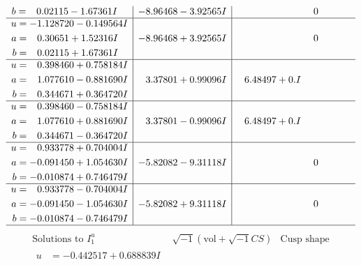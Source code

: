 \documentclass[1p]{elsarticle_modified}
\theoremstyle{definition}
\newcommand{\I}{\sqrt{-1}}
\begin{document}
$$\begin{array}{c|c|c}
\begin{aligned}
b &= \phantom{-}0.02115 - 1.67361 I\end{aligned}
 & -8.96468 - 3.92565 I & \phantom{-0.000000 } 0 \\ \hline\begin{aligned}
u &= -1.128720 - 0.149564 I \\
a &= \phantom{-}0.30651 + 1.52316 I \\
b &= \phantom{-}0.02115 + 1.67361 I\end{aligned}
 & -8.96468 + 3.92565 I & \phantom{-0.000000 } 0 \\ \hline\begin{aligned}
u &= \phantom{-}0.398460 + 0.758184 I \\
a &= \phantom{-}1.077610 - 0.881690 I \\
b &= \phantom{-}0.344671 + 0.364720 I\end{aligned}
 & \phantom{-}3.37801 + 0.99096 I & \phantom{-}6.48497 + 0. I\phantom{ +0.000000I} \\ \hline\begin{aligned}
u &= \phantom{-}0.398460 - 0.758184 I \\
a &= \phantom{-}1.077610 + 0.881690 I \\
b &= \phantom{-}0.344671 - 0.364720 I\end{aligned}
 & \phantom{-}3.37801 - 0.99096 I & \phantom{-}6.48497 + 0. I\phantom{ +0.000000I} \\ \hline\begin{aligned}
u &= \phantom{-}0.933778 + 0.704004 I \\
a &= -0.091450 + 1.054630 I \\
b &= -0.010874 + 0.746479 I\end{aligned}
 & -5.82082 - 9.31118 I & \phantom{-0.000000 } 0 \\ \hline\begin{aligned}
u &= \phantom{-}0.933778 - 0.704004 I \\
a &= -0.091450 - 1.054630 I \\
b &= -0.010874 - 0.746479 I\end{aligned}
 & -5.82082 + 9.31118 I & \phantom{-0.000000 } 0\\
 \hline 
 \end{array}$$\newpage$$\begin{array}{c|c|c}  
\text{Solutions to }I^u_{1}& \I (\text{vol} + \sqrt{-1}CS) & \text{Cusp shape}\\
 \hline 
\begin{aligned}
u &= -0.442517 + 0.688839 I \\

\end{aligned}
\end{array}$$
\end{document}
